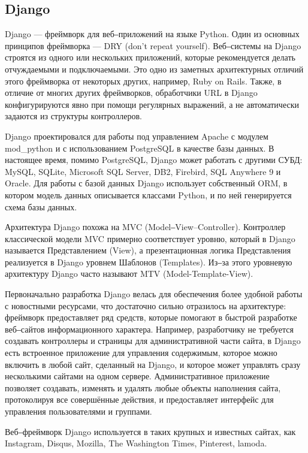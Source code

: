 \documentclass[a4paper,14pt]{extarticle}
\begin{document}
 	\subsection{Django}
 	
 	Django\cite{django} — фреймворк для веб‒приложений на языке Python\cite{python}. Один из основных принципов фреймворка — DRY (don't repeat yourself). Веб‒системы на Django строятся из одного или нескольких приложений, которые рекомендуется делать отчуждаемыми и подключаемыми. Это одно из заметных архитектурных отличий этого фреймворка от некоторых других, например, Ruby on Rails. Также, в отличие от многих других фреймворков, обработчики URL в Django конфигурируются явно при помощи регулярных выражений, а не автоматически задаются из структуры контроллеров.
 	
 	Django проектировался для работы под управлением Apache с модулем mod\_python и с использованием PostgreSQL в качестве базы данных. В настоящее время, помимо PostgreSQL, Django может работать с другими СУБД: MySQL, SQLite, Microsoft SQL Server, DB2, Firebird, SQL Anywhere 9 и Oracle. Для работы с базой данных Django использует собственный ORM, в котором модель данных описывается классами Python, и по ней генерируется схема базы данных.
 	
 	Архитектура Django похожа на MVC\cite{mvc_info} (Model‒View–Controller). Контроллер классической модели MVC примерно соответствует уровню, который в Django называется Представлением (View), а презентационная логика Представления реализуется в Django уровнем Шаблонов (Templates). Из‒за этого уровневую архитектуру Django часто называют MTV (Model-Template-View).
 	
 	Первоначально разработка Django велась для обеспечения более удобной работы с новостными ресурсами, что достаточно сильно отразилось на архитектуре: фреймворк предоставляет ряд средств, которые помогают в быстрой разработке веб‒сайтов информационного характера. Например, разработчику не требуется создавать контроллеры и страницы для административной части сайта, в Django есть встроенное приложение для управления содержимым, которое можно включить в любой сайт, сделанный на Django, и которое может управлять сразу несколькими сайтами на одном сервере. Административное приложение позволяет создавать, изменять и удалять любые объекты наполнения сайта, протоколируя все совершённые действия, и предоставляет интерфейс для управления пользователями и группами.
 	
 	Веб‒фреймворк Django используется в таких крупных и известных сайтах, как Instagram, Disqus, Mozilla, The Washington Times, Pinterest, lamoda. 
 	
\end{document}
